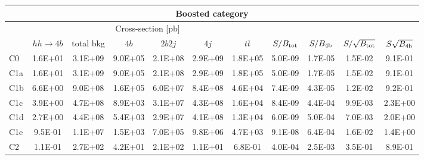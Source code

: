 \begin{tabular}{|l|cc|cccc|cccc|}
  \hline
\multicolumn{11}{|c|}{Boosted category}\\
\hline
&  \multicolumn{6}{c|}{Cross-section [pb]} &  &  & &  \\
   &  $hh\to 4b$ &  total bkg  &   $4b$    &  $2b2j$   &   $4j$    &
$t\bar{t}$ &
$S/B_{\rm tot}$ & $S/B_{\rm 4b}$ & $S/\sqrt{B_{\rm tot}}$ & $S\sqrt{B_{\rm 4b}}$ \\
  \hline
  \hline
 C0      & 1.6E+01  &   3.1E+09   & 9.0E+05 & 2.1E+08 & 2.9E+09 & 1.8E+05 &   5.0E-09   & 1.7E-05  &   1.5E-02   & 9.1E-01 \\
 C1a     & 1.6E+01  &   3.1E+09   & 9.0E+05 & 2.1E+08 & 2.9E+09 & 1.8E+05 &   5.0E-09   & 1.7E-05   &   1.5E-02   & 9.1E-01 \\
 C1b     & 6.6E+00  &   9.0E+08   & 1.6E+05 & 6.0E+07 & 8.4E+08 & 4.6E+04 &   7.4E-09   & 4.3E-05   &   1.2E-02   & 9.2E-01 \\
 C1c     & 3.9E+00  &   4.7E+08   & 8.9E+03 & 3.1E+07 & 4.3E+08 & 1.6E+04   &   8.4E-09   & 4.4E-04  &   9.9E-03   & 2.3E+00 \\
 C1d     & 2.7E+00  &   4.4E+08   & 5.4E+03 & 2.9E+07 & 4.1E+08 & 1.3E+04 &   6.0E-09   & 5.0E-04  &   7.0E-03   & 2.0E+00 \\
 C1e     & 9.5E-01  &   1.1E+07   & 1.5E+03 & 7.0E+05 & 9.8E+06 & 4.7E+03  &   9.1E-08   & 6.4E-04  &   1.6E-02   & 1.4E+00 \\
 C2      & 1.1E-01  &   2.7E+02   & 4.2E+01 & 2.1E+02 & 1.1E+01 & 6.8E-01  &   4.0E-04   & 2.5E-03  &   3.5E-01   & 8.9E-01 \\
\hline
\end{tabular}
